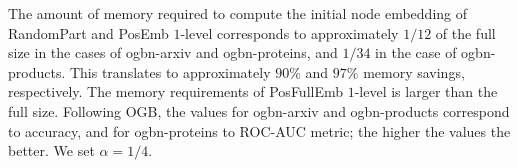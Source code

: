 \documentclass[conference]{IEEEtran}
\begin{document}
\begin{table*}[!t]
\begin{threeparttable}
\begin{tablenotes}
            The amount of memory required to compute the initial node embedding of RandomPart and PosEmb $1$-level corresponds to approximately $1/12$ of the full size in the cases of ogbn-arxiv and ogbn-proteins, and $1/34$ in the case of ogbn-products. 
            This translates to approximately $90\%$ and $97\%$ memory savings, respectively.
            The memory requirements of PosFullEmb $1$-level is larger than the full size.
            Following OGB, the values for ogbn-arxiv and ogbn-products correspond to accuracy, and for ogbn-proteins to ROC-AUC metric; the higher the values the better. We set $\alpha=1/4$.
        \end{tablenotes}
  \end{threeparttable}
\end{table*}
\end{document}
